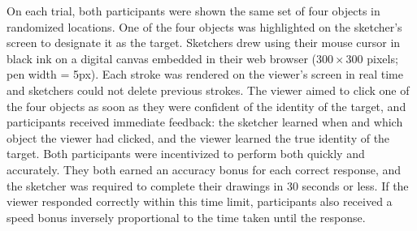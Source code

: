 On each trial, both participants were shown the same set of four objects in randomized locations.
One of the four objects was highlighted on the sketcher's screen to designate it as the target.
Sketchers drew using their mouse cursor in black ink on a digital canvas embedded in their web browser ($300 \times 300$ pixels; pen width = 5px).
Each stroke was rendered on the viewer's screen in real time and sketchers could not delete previous strokes.
The viewer aimed to click one of the four objects as soon as they were confident of the identity of the target, and participants received immediate feedback: the sketcher learned when and which object the viewer had clicked, and the viewer learned the true identity of the target.
Both participants were incentivized to perform both quickly and accurately.
They both earned an accuracy bonus for each correct response, and the sketcher was required to complete their drawings in 30 seconds or less.
If the viewer responded correctly within this time limit, participants also received a speed bonus inversely proportional to the time taken until the response.



